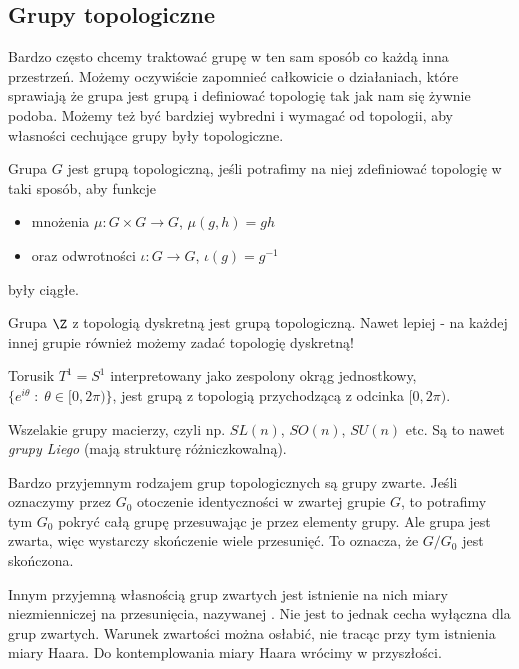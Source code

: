 \subsection{Grupy topologiczne}

Bardzo często chcemy traktować grupę w ten sam sposób co każdą inna przestrzeń. Możemy oczywiście zapomnieć całkowicie o działaniach, które sprawiają że grupa jest grupą i definiować topologię tak jak nam się żywnie podoba. Możemy też być bardziej wybredni i wymagać od topologii, aby własności cechujące grupy były topologiczne.

\begin{definition}{}{}
  Grupa $G$ jest grupą topologiczną, jeśli potrafimy na niej zdefiniować topologię w taki sposób, aby funkcje
  \begin{itemize}
    \item mnożenia $\mu:G\times G\to G$, $\mu(g,h)=gh$
    \item oraz odwrotności $\iota:G\to G$, $\iota(g)=g^{-1}$
  \end{itemize}
  były ciągłe.
\end{definition}

\begin{example}[m]
\item Grupa $\Z$ z topologią dyskretną jest grupą topologiczną. Nawet lepiej - na każdej innej grupie również możemy zadać topologię dyskretną!
\item Torusik $T^1=S^1$ interpretowany jako zespolony okrąg jednostkowy, $\{e^{i\theta}\;:\;\theta\in[0,2\pi)\}$, jest grupą z topologią przychodzącą z odcinka $[0,2\pi)$.
\item Wszelakie grupy macierzy, czyli np. $SL(n)$, $SO(n)$, $SU(n)$ etc. Są to nawet \emph{grupy Liego} (mają strukturę różniczkowalną).
\end{example}

Bardzo przyjemnym rodzajem grup topologicznych są grupy zwarte. Jeśli oznaczymy przez $G_0$ otoczenie identyczności w zwartej grupie $G$, to potrafimy tym $G_0$ pokryć całą grupę przesuwając je przez elementy grupy. Ale grupa jest zwarta, więc wystarczy skończenie wiele przesunięć. To oznacza, że $G/G_0$ jest skończona.

Innym przyjemną własnością grup zwartych jest istnienie na nich miary niezmienniczej na przesunięcia, nazywanej . Nie jest to jednak cecha wyłączna dla grup zwartych. Warunek zwartości można osłabić, nie tracąc przy tym istnienia miary Haara. Do kontemplowania miary Haara wrócimy w przyszłości.

